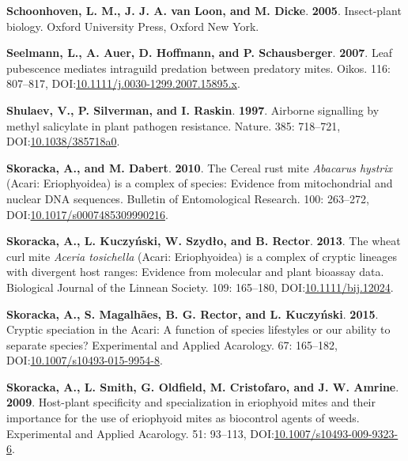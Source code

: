 \documentclass[12pt,final,CPage]{ufthesis}
\newlength{\cslhangindent}
\newenvironment{CSLReferences}[2] %
{%
	\setlength{\parindent}{0pt}
	\ifodd #1 \everypar{\setlength{\hangindent}{\cslhangindent}}\ignorespaces\fi
	\ifnum #2 > 0
	\setlength{\parskip}{#2\baselineskip}
	\fi
}%
{}
\begin{document}
{\begin{CSLReferences}{1}{0}
  \leavevmode{}%
  \textbf{Schoonhoven, L. M., J. J. A. van Loon, and M. Dicke}. \textbf{2005}. Insect-plant biology. Oxford University Press, Oxford New York.

  \leavevmode{}%
  \textbf{Seelmann, L., A. Auer, D. Hoffmann, and P. Schausberger}. \textbf{2007}. Leaf pubescence mediates intraguild predation between predatory mites. Oikos. 116: 807--817, DOI:\href{https://doi.org/10.1111/j.0030-1299.2007.15895.x}{10.1111/j.0030-1299.2007.15895.x}.

  \leavevmode{}%
  \textbf{Shulaev, V., P. Silverman, and I. Raskin}. \textbf{1997}. Airborne signalling by methyl salicylate in plant pathogen resistance. Nature. 385: 718--721, DOI:\href{https://doi.org/10.1038/385718a0}{10.1038/385718a0}.

  \leavevmode{}%
  \textbf{Skoracka, A., and M. Dabert}. \textbf{2010}. The {Cereal rust mite} {\emph{Abacarus hystrix}} ({Acari}: {Eriophyoidea}) is a complex of species: Evidence from mitochondrial and nuclear {DNA} sequences. Bulletin of Entomological Research. 100: 263--272, DOI:\href{https://doi.org/10.1017/s0007485309990216}{10.1017/s0007485309990216}.

  \leavevmode{}%
  \textbf{Skoracka, A., L. Kuczyński, W. Szydło, and B. Rector}. \textbf{2013}. The wheat curl mite {\emph{Aceria tosichella}} ({Acari: Eriophyoidea}) is a complex of cryptic lineages with divergent host ranges: Evidence from molecular and plant bioassay data. Biological Journal of the Linnean Society. 109: 165--180, DOI:\href{https://doi.org/10.1111/bij.12024}{10.1111/bij.12024}.

  \leavevmode{}%
  \textbf{Skoracka, A., S. Magalhães, B. G. Rector, and L. Kuczyński}. \textbf{2015}. Cryptic speciation in the {Acari}: A function of species lifestyles or our ability to separate species? Experimental and Applied Acarology. 67: 165--182, DOI:\href{https://doi.org/10.1007/s10493-015-9954-8}{10.1007/s10493-015-9954-8}.

  \leavevmode{}%
  \textbf{Skoracka, A., L. Smith, G. Oldfield, M. Cristofaro, and J. W. Amrine}. \textbf{2009}. Host-plant specificity and specialization in eriophyoid mites and their importance for the use of eriophyoid mites as biocontrol agents of weeds. Experimental and Applied Acarology. 51: 93--113, DOI:\href{https://doi.org/10.1007/s10493-009-9323-6}{10.1007/s10493-009-9323-6}.


\end{CSLReferences}}
\end{document}
